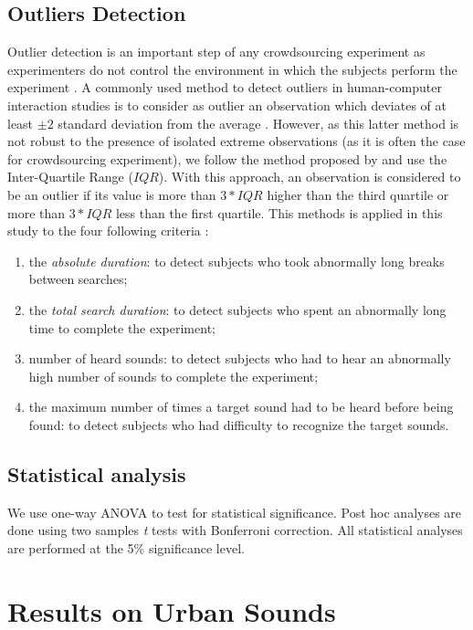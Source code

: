 \documentclass{aes2e}
\begin{document}
\subsection{Outliers Detection}

Outlier detection is an important step of any crowdsourcing experiment as experimenters do not control the environment in which the subjects perform the experiment \cite{komarov2013crowdsourcing,buchholz2011crowdsourcing}. A commonly used method to detect outliers in  human-computer interaction studies is to consider as outlier an observation which deviates of at least $\pm2$ standard deviation from the average \cite{komarov2013crowdsourcing}. However, as this latter method is not robust to the presence of isolated extreme observations (as it is often the case for crowdsourcing experiment), we follow the  method proposed by \cite{komarov2013crowdsourcing} and use the Inter-Quartile Range ($IQR$). With this approach, an observation is considered to be an outlier if its value is more than $3*IQR$ higher than the third quartile or more than $3*IQR$ less than the first quartile. This methods is applied in this study to the four following criteria :

\begin{enumerate}
\item the \textit{absolute duration}: to detect subjects who took abnormally long breaks between searches;
\item the \textit{total search duration}: to detect subjects who spent an abnormally long time to complete the experiment;
\item number of heard sounds: to detect subjects who had to hear an abnormally high number of sounds to complete the experiment;
\item the maximum number of times a target sound had to be heard before being found: to detect subjects who had difficulty to recognize the target sounds.
\end{enumerate}

\subsection{Statistical analysis}

We use one-way ANOVA to test for statistical significance. Post hoc analyses are done using two samples \textit{t} tests with Bonferroni correction. All statistical analyses are performed at the 5\% significance level.


\section{Results on Urban Sounds} \label{resultsu}
\end{document}
